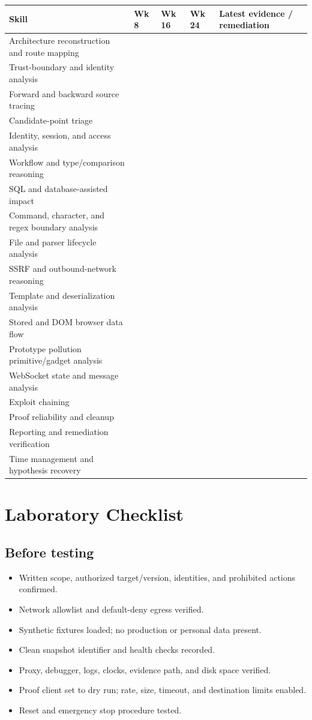 \documentclass[11pt]{article}
\begin{document}
\begin{longtable}{@{}L{0.27\textwidth}L{0.09\textwidth}L{0.09\textwidth}L{0.09\textwidth}L{0.25\textwidth}@{}}
\toprule
\textbf{Skill} & \textbf{Wk 8} & \textbf{Wk 16} & \textbf{Wk 24} & \textbf{Latest evidence / remediation} \\
\midrule
\endhead
Architecture reconstruction and route mapping & & & & \\
Trust-boundary and identity analysis & & & & \\
Forward and backward source tracing & & & & \\
Candidate-point triage & & & & \\
Identity, session, and access analysis & & & & \\
Workflow and type/comparison reasoning & & & & \\
SQL and database-assisted impact & & & & \\
Command, character, and regex boundary analysis & & & & \\
File and parser lifecycle analysis & & & & \\
SSRF and outbound-network reasoning & & & & \\
Template and deserialization analysis & & & & \\
Stored and DOM browser data flow & & & & \\
Prototype pollution primitive/gadget analysis & & & & \\
WebSocket state and message analysis & & & & \\
Exploit chaining & & & & \\
Proof reliability and cleanup & & & & \\
Reporting and remediation verification & & & & \\
Time management and hypothesis recovery & & & & \\
\bottomrule
\end{longtable}

\section{Laboratory Checklist}

\subsection*{Before testing}
\begin{itemize}[label=$\square$]
  \item Written scope, authorized target/version, identities, and prohibited actions confirmed.
  \item Network allowlist and default-deny egress verified.
  \item Synthetic fixtures loaded; no production or personal data present.
  \item Clean snapshot identifier and health checks recorded.
  \item Proxy, debugger, logs, clocks, evidence path, and disk space verified.
  \item Proof client set to dry run; rate, size, timeout, and destination limits enabled.
  \item Reset and emergency stop procedure tested.
\end{itemize}
\end{document}
